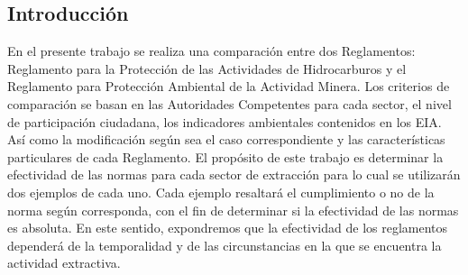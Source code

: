 \documentclass[12pt, a4paper]{article} %
\begin{document}
    \begin{multicols}{2}
        \section{Introducción} \vspace{-3mm}
        En el presente trabajo se realiza una comparación entre dos Reglamentos: Reglamento para la Protección de las Actividades de Hidrocarburos y el Reglamento para Protección Ambiental de la Actividad Minera. Los criterios de comparación se basan en las Autoridades Competentes para cada sector, el nivel de participación ciudadana, los indicadores ambientales contenidos en los EIA. Así como la modificación según sea el caso correspondiente y las características particulares de cada Reglamento. El propósito de este trabajo es determinar la efectividad de las normas para cada sector de extracción para lo cual se utilizarán dos ejemplos de cada uno. Cada ejemplo resaltará el cumplimiento o no de la norma según corresponda, con el fin de determinar si la efectividad de las normas es absoluta. En este sentido, expondremos que la efectividad de los reglamentos dependerá de la temporalidad y de las circunstancias en la que se encuentra la actividad extractiva.
        

\end{multicols}
\end{document}
